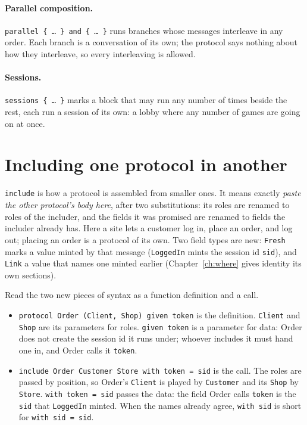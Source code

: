 

\paragraph{Parallel composition.} \texttt{parallel \{ \ldots\ \} and \{ \ldots\ \}} runs
branches whose messages interleave in any order. Each branch is a conversation of its
own; the protocol says nothing about how they interleave, so every interleaving is
allowed.



\paragraph{Sessions.} \texttt{sessions \{ \ldots\ \}} marks a block that may run any
number of times beside the rest, each run a session of its own: a lobby where any
number of games are going on at once.

\section{Including one protocol in another}\label{sec:include}

\texttt{include} is how a protocol is assembled from smaller ones. It means exactly
\emph{paste the other protocol's body here}, after two substitutions: its roles are
renamed to roles of the includer, and the fields it was promised are renamed to fields
the includer already has. Here a site lets a customer log in, place an order, and log
out; placing an order is a protocol of its own. Two field types are new:
\texttt{Fresh} marks a value minted by that message (\texttt{LoggedIn} mints the session
id \texttt{sid}), and \texttt{Link} a value that names one minted earlier
(Chapter~\ref{ch:where} gives identity its own sections).



Read the two new pieces of syntax as a function definition and a call.
\begin{itemize}
\item \texttt{protocol Order (Client, Shop) given token} is the definition.
  \texttt{Client} and \texttt{Shop} are its parameters for roles. \texttt{given token}
  is a parameter for data: Order does not create the session id it runs under; whoever
  includes it must hand one in, and Order calls it \texttt{token}.
\item \texttt{include Order Customer Store with token = sid} is the call. The roles are
  passed by position, so Order's \texttt{Client} is played by \texttt{Customer} and its
  \texttt{Shop} by \texttt{Store}. \texttt{with token = sid} passes the data: the field
  Order calls \texttt{token} is the \texttt{sid} that \texttt{LoggedIn} minted. When
  the names already agree, \texttt{with sid} is short for \texttt{with sid = sid}.
\end{itemize}


